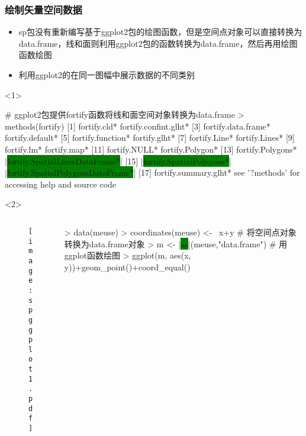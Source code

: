 \subsubsection{绘制矢量空间数据}
\begin{frame}[t,fragile]{\subsecname}{\subsubsecname}
\begin{itemize} 
\item<1-> sp包没有重新编写基于ggplot2包的绘图函数，但是空间点对象可以直接转换为data.frame，线和面则利用ggplot2包的函数转换为data.frame，然后再用绘图函数绘图
\item<5-> 利用ggplot2的在同一图幅中展示数据的不同类别
\end{itemize}

\begin{overlayarea}{\textwidth}{\textheight}
\begin{onlyenv}<1>
\begin{rcode}
# ggplot2包提供fortify函数将线和面空间对象转换为data.frame
> methods(fortify)
 [1] fortify.cld*                      fortify.confint.glht*            
 [3] fortify.data.frame*               fortify.default*                 
 [5] fortify.function*                 fortify.glht*                    
 [7] fortify.Line*                     fortify.Lines*                   
 [9] fortify.lm*                       fortify.map*                     
[11] fortify.NULL*                     fortify.Polygon*                 
[13] fortify.Polygons*                 |\colorbox{green}{fortify.SpatialLinesDataFrame*}|   
[15] |\colorbox{green}{fortify.SpatialPolygons*}|          |\colorbox{green}{fortify.SpatialPolygonsDataFrame*}|
[17] fortify.summary.glht*            
see '?methods' for accessing help and source code
\end{rcode}
\end{onlyenv}

\begin{onlyenv}<2>
\begin{columns} 
\begin{column}{.4\textwidth}
\begin{figure}[ht] \vspace{-10pt}
  \centering 
  \texttt{[image: spggplot1.pdf]}
\end{figure}
\end{column}

\begin{column}{.6\textwidth}
\centering
\begin{rcode}
> data(meuse)
> coordinates(meuse) <- ~x+y
# 将空间点对象转换为data.frame对象
> m <- |\colorbox{green}{as}|(meuse,"data.frame")
# 用ggplot函数绘图
> ggplot(m, aes(x, y))+geom_point()+coord_equal()
\end{rcode}
\end{column}
\end{columns}
\end{onlyenv}


\end{overlayarea}
\end{frame}
